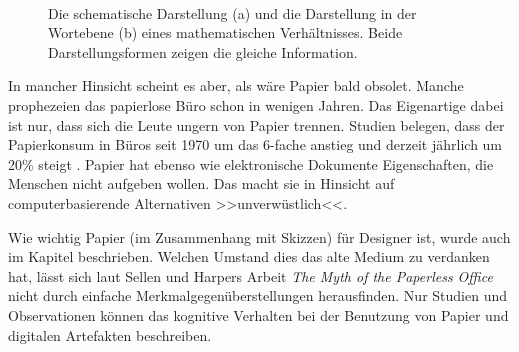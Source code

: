 \begin{figure}
        \myfloatalign
         \quad
         \\
        \caption[Darstellungsformen]{Die schematische Darstellung (a) und die Darstellung in der Wortebene (b) eines mathematischen Verhältnisses. Beide Darstellungsformen zeigen die gleiche Information. }\label{fig:johnsonDarstellungsformen}
\end{figure}

\medskip In mancher Hinsicht scheint es aber, als wäre Papier bald obsolet. Manche prophezeien das papierlose Büro schon in wenigen Jahren. Das Eigenartige dabei ist nur, dass sich die Leute ungern von Papier trennen. Studien belegen, dass der Papierkonsum in Büros seit 1970 um das 6-fache anstieg und derzeit jährlich um 20\% steigt \citep{seybold:1992}. Papier hat ebenso wie elektronische Dokumente Eigenschaften, die Menschen nicht aufgeben wollen. Das macht sie in Hinsicht auf computerbasierende Alternativen >>unverwüstlich<<. \citep{Luff:1992} 

\medskip Wie wichtig Papier (im Zusammenhang mit Skizzen) für Designer ist, wurde auch im Kapitel  beschrieben. Welchen Umstand dies das alte Medium zu verdanken hat, lässt sich laut Sellen und Harpers Arbeit \emph{The Myth of the Paperless Office} \citep{Sellen:2003} nicht durch einfache Merkmalgegenüberstellungen herausfinden. Nur Studien und Observationen können das kognitive Verhalten bei der Benutzung von Papier und digitalen Artefakten beschreiben. 

